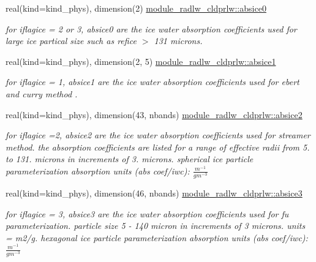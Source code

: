 \begin{DoxyCompactItemize}
\mbox{\label{namespacemodule__radlw__cldprlw_a6610d37cab9ccd4de89237c5de536cfb}} 
real(kind=kind\+\_\+phys), dimension(2) \hyperlink{namespacemodule__radlw__cldprlw_a6610d37cab9ccd4de89237c5de536cfb}{module\+\_\+radlw\+\_\+cldprlw\+::absice0}
\begin{DoxyCompactList}\small\item\em for iflagice = 2 or 3, absice0 are the ice water absorption coefficients used for large ice partical size such as refice $>$ 131 microns. \end{DoxyCompactList}\item 
\mbox{\label{namespacemodule__radlw__cldprlw_a3b86ff9d6791d95170d3b3ab61cd8291}} 
real(kind=kind\+\_\+phys), dimension(2, 5) \hyperlink{namespacemodule__radlw__cldprlw_a3b86ff9d6791d95170d3b3ab61cd8291}{module\+\_\+radlw\+\_\+cldprlw\+::absice1}
\begin{DoxyCompactList}\small\item\em for iflagice = 1, absice1 are the ice water absorption coefficients used for ebert and curry method \cite{ebert_and_curry_1992} . \end{DoxyCompactList}\item 
\mbox{\label{namespacemodule__radlw__cldprlw_ad2238686c0e6d1c5d74bcfdde1542e1d}} 
real(kind=kind\+\_\+phys), dimension(43, nbands) \hyperlink{namespacemodule__radlw__cldprlw_ad2238686c0e6d1c5d74bcfdde1542e1d}{module\+\_\+radlw\+\_\+cldprlw\+::absice2}
\begin{DoxyCompactList}\small\item\em for iflagice =2, absice2 are the ice water absorption coefficients used for streamer method. the absorption coefficients are listed for a range of effective radii from 5. to 131. microns in increments of 3. microns. spherical ice particle parameterization absorption units (abs coef/iwc)\+: $\frac{m^{-1}}{gm^{-3}}$ \end{DoxyCompactList}\item 
\mbox{\label{namespacemodule__radlw__cldprlw_a3aa04541d0b809367f88ef8aa0eafdbb}} 
real(kind=kind\+\_\+phys), dimension(46, nbands) \hyperlink{namespacemodule__radlw__cldprlw_a3aa04541d0b809367f88ef8aa0eafdbb}{module\+\_\+radlw\+\_\+cldprlw\+::absice3}
\begin{DoxyCompactList}\small\item\em for iflagice = 3, absice3 are the ice water absorption coefficients used for fu parameterization. particle size 5 -\/ 140 micron in increments of 3 microns. units = m2/g. hexagonal ice particle parameterization absorption units (abs coef/iwc)\+: $\frac{m^{-1}}{gm^{-3}}$ \end{DoxyCompactList}\item 

\end{DoxyCompactItemize}
